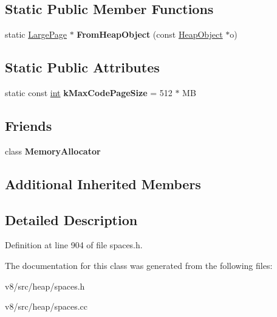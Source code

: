 \subsection*{Static Public Member Functions}
\begin{DoxyCompactItemize}
\item 
\mbox{\label{classv8_1_1internal_1_1LargePage_ab92126433ba2bd962c8887057c18a168}} 
static \mbox{\hyperlink{classv8_1_1internal_1_1LargePage}{Large\+Page}} $\ast$ {\bfseries From\+Heap\+Object} (const \mbox{\hyperlink{classv8_1_1internal_1_1HeapObject}{Heap\+Object}} $\ast$o)
\end{DoxyCompactItemize}
\subsection*{Static Public Attributes}
\begin{DoxyCompactItemize}
\item 
\mbox{\label{classv8_1_1internal_1_1LargePage_ac2fb864e1fbbebf13d482e121c110f36}} 
static const \mbox{\hyperlink{classint}{int}} {\bfseries k\+Max\+Code\+Page\+Size} = 512 $\ast$ MB
\end{DoxyCompactItemize}
\subsection*{Friends}
\begin{DoxyCompactItemize}
\item 
\mbox{\label{classv8_1_1internal_1_1LargePage_aea1126d5a764b0d074d2d6edb5a09f23}} 
class {\bfseries Memory\+Allocator}
\end{DoxyCompactItemize}
\subsection*{Additional Inherited Members}


\subsection{Detailed Description}


Definition at line 904 of file spaces.\+h.



The documentation for this class was generated from the following files\+:\begin{DoxyCompactItemize}
\item 
v8/src/heap/spaces.\+h\item 
v8/src/heap/spaces.\+cc\end{DoxyCompactItemize}
